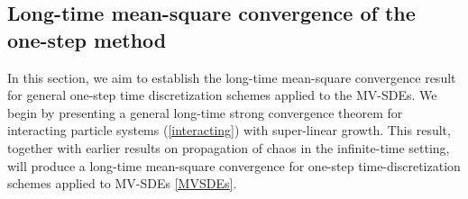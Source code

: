 \documentclass[12pt]{article}
\numberwithin{equation}{section}
\begin{document}
\subsection{Long-time mean-square convergence   of the one-step method}\label{The long-time mean-square convergence results of the one-step method for MV-SDEs}

In this section, we aim to establish the long-time mean-square convergence result for general one-step time discretization schemes applied to the MV-SDEs. We begin by presenting a general long-time strong convergence theorem for interacting particle systems (\ref{interacting}) with super-linear growth.  This result, together  with  earlier results on propagation of chaos   in the infinite-time setting, 
will produce a long-time mean-square convergence   for one-step time-discretization schemes applied to MV-SDEs \eqref{MVSDEs}.
\end{document}
